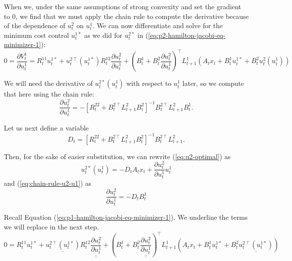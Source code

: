\documentclass[11pt]{article}
\newcommand{\T}{\intercal}
\newcommand\dd[2]{\frac{\partial#1}{\partial#2}}
\def\doubleunderline#1{\underline{\underline{#1}}}
\begin{document}
When we, under the same assumptions of strong convexity and set the gradient to 0, we find that we must apply the chain rule to compute the derivative because of the dependence of $u^2_t$ on $u^1_t$. We can now differentiate and solve for the minimum cost control $u^{1*}_t$ as we did for $u^{2*}_t$ in (\ref{eq:p2-hamilton-jacobi-eq-minimizer-1}):
\begin{equation}
\label{eq:p1-hamilton-jacobi-eq-minimizer-1}
0 = \dd{V^{1}_t}{u^{1}_t} = R^{11}_t u^{1*}_t + u^{2\T}_t(u^{1*}_t) R^{12}_t \dd{u^{2}_t}{u^{1}_t} + \left(B^1_t + B^2_t \dd{u^{2}_t}{u^{1}_t} \right)^\T L^1_{t+1} \left( A_t x_t + B^1_t u^{1*}_t + B^2_t u^2_t(u^1_t) \right)
\end{equation}

We will need the derivative of $u^{2*}_t(u^1_t)$ with respect to $u^1_t$ later, so we compute that here using the chain rule:
\begin{equation}
\label{eq:chain-rule-u2-u1}
\dd{u^{2}_t}{u^{1}_t} = -\left[R^{22}_t + B^{2\T}_t L^2_{t+1} B^2_t\right]^{-1} B^{2\T}_t L^2_{t+1} B^1_t.
\end{equation}

Let us next define a variable
\begin{equation}
\label{eq:D-substitution}
D_t = \left[ R^{22}_t + B^{2\T}_t L^2_{t+1} B^2_t \right]^{-1} B^{2\T}_t L^2_{t+1}.
\end{equation}

Then, for the sake of easier substitution, we can rewrite (\ref{eq:u2-optimal}) as
\begin{equation}
\label{eq:u2-optimal-2}
u^{2*}_t\left(u^{1}_t\right) = -D_t A_t x_t + \dd{u^2_t}{u^1_t} u^1_t
\end{equation}
and (\ref{eq:chain-rule-u2-u1}) as
\begin{equation}
\label{eq:du2-du1-optimal-2}
\dd{u^2_t}{u^1_t} = -D_tB^1_t
\end{equation}

Recall Equation (\ref{eq:p1-hamilton-jacobi-eq-minimizer-1}). We underline the terms we will replace in the next step.
\begin{equation}
\label{eq:p1-hamilton-jacobi-eq-minimizer-1-rehash}
0 = R^{11}_t u^{1*}_t + \underline{u^{2\T}_t(u^{1*}_t)} R^{12}_t \doubleunderline{\dd{u^{2}_t}{u^{1}_t}} + \left(B^1_t + B^2_t \doubleunderline{\dd{u^{2}_t}{u^{1}_t}} \right)^\T L^1_{t+1} \left( A_t x_t + B^1_t u^{1*}_t + B^2_t \underline{u^{2\T}_t(u^{1*}_t)} \right)
\end{equation}
\end{document}
